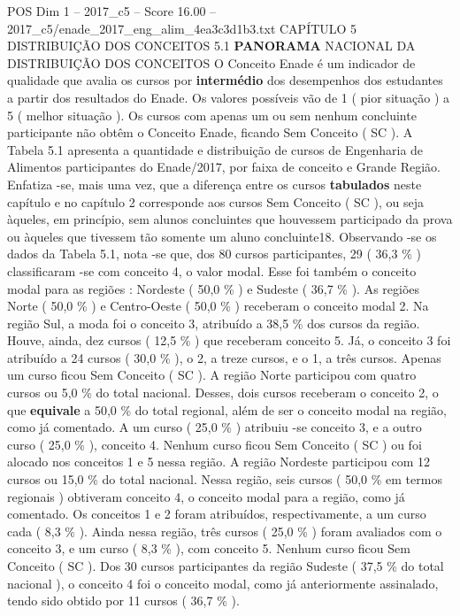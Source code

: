 \begin{textsample}{POS Dim 1 – 2017\_c5 – Score 16.00 – 2017\_c5/enade\_2017\_eng\_alim\_4ea3c3d1b3.txt}  \label{ex:f1_pos_053}
CAPÍTULO 5 DISTRIBUIÇÃO DOS CONCEITOS 5.1 \textbf{PANORAMA} NACIONAL DA DISTRIBUIÇÃO DOS CONCEITOS O Conceito Enade é um indicador de qualidade que avalia os cursos por \textbf{intermédio} dos desempenhos dos estudantes a partir dos resultados do Enade.
Os valores possíveis vão de 1 ( pior situação ) a 5 ( melhor situação ).
Os cursos com apenas um ou sem nenhum concluinte participante não obtêm o Conceito Enade, ficando Sem Conceito ( SC ).
A Tabela 5.1 apresenta a quantidade e distribuição de cursos de Engenharia de Alimentos participantes do Enade/2017, por faixa de conceito e Grande Região.
Enfatiza -se, mais uma vez, que a diferença entre os cursos \textbf{tabulados} neste capítulo e no capítulo 2 corresponde aos cursos Sem Conceito ( SC ), ou seja àqueles, em princípio, sem alunos concluintes que houvessem participado da prova ou àqueles que tivessem tão somente um aluno concluinte18.
Observando -se os dados da Tabela 5.1, nota -se que, dos 80 cursos participantes, 29 ( 36,3 \% ) classificaram -se com conceito 4, o valor modal.
Esse foi também o conceito modal para as regiões : Nordeste ( 50,0 \% ) e Sudeste ( 36,7 \% ).
As regiões Norte ( 50,0 \% ) e Centro-Oeste ( 50,0 \% ) receberam o conceito modal 2.
Na região Sul, a moda foi o conceito 3, atribuído a 38,5 \% dos cursos da região.
Houve, ainda, dez cursos ( 12,5 \% ) que receberam conceito 5.
Já, o conceito 3 foi atribuído a 24 cursos ( 30,0 \% ), o 2, a treze cursos, e o 1, a três cursos.
Apenas um curso ficou Sem Conceito ( SC ).
A região Norte participou com quatro cursos ou 5,0 \% do total nacional.
Desses, dois cursos receberam o conceito 2, o que \textbf{equivale} a 50,0 \% do total regional, além de ser o conceito modal na região, como já comentado.
A um curso ( 25,0 \% ) atribuiu -se conceito 3, e a outro curso ( 25,0 \% ), conceito 4.
Nenhum curso ficou Sem Conceito ( SC ) ou foi alocado nos conceitos 1 e 5 nessa região.
A região Nordeste participou com 12 cursos ou 15,0 \% do total nacional.
Nessa região, seis cursos ( 50,0 \% em termos regionais ) obtiveram conceito 4, o conceito modal para a região, como já comentado.
Os conceitos 1 e 2 foram atribuídos, respectivamente, a um curso cada ( 8,3 \% ).
Ainda nessa região, três cursos ( 25,0 \% ) foram avaliados com o conceito 3, e um curso ( 8,3 \% ), com conceito 5.
Nenhum curso ficou Sem Conceito ( SC ).
Dos 30 cursos participantes da região Sudeste ( 37,5 \% do total nacional ), o conceito 4 foi o conceito modal, como já anteriormente assinalado, tendo sido obtido por 11 cursos ( 36,7 \% ).

\end{textsample}
